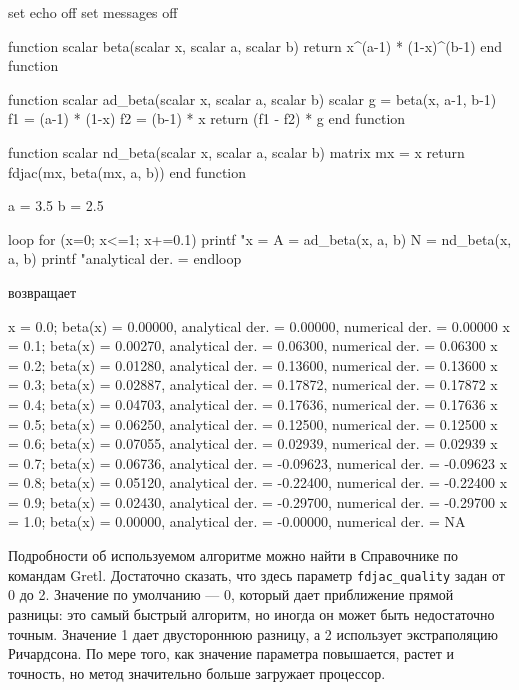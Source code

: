 \begin{code}
set echo off
set messages off

function scalar beta(scalar x, scalar a, scalar b)
    return x^(a-1) * (1-x)^(b-1)
end function

function scalar ad_beta(scalar x, scalar a, scalar b)
    scalar g = beta(x, a-1, b-1)
    f1 = (a-1) * (1-x)
    f2 = (b-1) * x
    return (f1 - f2) * g
end function

function scalar nd_beta(scalar x, scalar a, scalar b)
    matrix mx = {x}
    return fdjac(mx, beta(mx, a, b))
end function

a = 3.5
b = 2.5

loop for (x=0; x<=1; x+=0.1)
    printf "x = %
    A = ad_beta(x, a, b)
    N = nd_beta(x, a, b)
    printf "analytical der. = %
endloop
\end{code}

возвращает
\begin{code}
x = 0.0; beta(x) = 0.00000, analytical der. =  0.00000, numerical der. =  0.00000
x = 0.1; beta(x) = 0.00270, analytical der. =  0.06300, numerical der. =  0.06300
x = 0.2; beta(x) = 0.01280, analytical der. =  0.13600, numerical der. =  0.13600
x = 0.3; beta(x) = 0.02887, analytical der. =  0.17872, numerical der. =  0.17872
x = 0.4; beta(x) = 0.04703, analytical der. =  0.17636, numerical der. =  0.17636
x = 0.5; beta(x) = 0.06250, analytical der. =  0.12500, numerical der. =  0.12500
x = 0.6; beta(x) = 0.07055, analytical der. =  0.02939, numerical der. =  0.02939
x = 0.7; beta(x) = 0.06736, analytical der. = -0.09623, numerical der. = -0.09623
x = 0.8; beta(x) = 0.05120, analytical der. = -0.22400, numerical der. = -0.22400
x = 0.9; beta(x) = 0.02430, analytical der. = -0.29700, numerical der. = -0.29700
x = 1.0; beta(x) = 0.00000, analytical der. = -0.00000, numerical der. =       NA
\end{code}

Подробности об используемом алгоритме можно найти в Справочнике по
командам Gretl. Достаточно сказать, что здесь параметр
\texttt{fdjac\_quality} задан от 0 до 2. Значение по умолчанию --- 0,
который дает приближение прямой разницы: это самый быстрый алгоритм,
но иногда он может быть недостаточно точным. Значение 1 дает
двустороннюю разницу, а 2 использует экстраполяцию Ричардсона. По мере
того, как значение параметра повышается, растет и точность, но метод
значительно больше загружает процессор.




